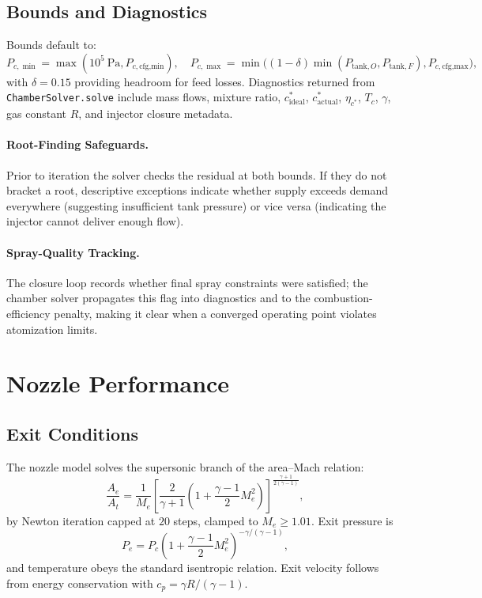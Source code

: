\documentclass[12pt]{article}
\begin{document}
\subsection{Bounds and Diagnostics}
Bounds default to:
\[
P_{c,\min} = \max(10^5~\text{Pa}, P_{c,\text{cfg,min}}),\quad
P_{c,\max} = \min\bigl((1-\delta)\min(P_{\text{tank},O}, P_{\text{tank},F}), P_{c,\text{cfg,max}}\bigr),
\]
with $\delta = 0.15$ providing headroom for feed losses.  Diagnostics returned from \verb|ChamberSolver.solve| include mass flows, mixture ratio, $c^*_{\text{ideal}}$, $c^*_{\text{actual}}$, $\eta_{c^*}$, $T_c$, $\gamma$, gas constant $R$, and injector closure metadata.

\paragraph{Root-Finding Safeguards.}  Prior to iteration the solver checks the residual at both bounds.  If they do not bracket a root, descriptive exceptions indicate whether supply exceeds demand everywhere (suggesting insufficient tank pressure) or vice versa (indicating the injector cannot deliver enough flow).

\paragraph{Spray-Quality Tracking.}  The closure loop records whether final spray constraints were satisfied; the chamber solver propagates this flag into diagnostics and to the combustion-efficiency penalty, making it clear when a converged operating point violates atomization limits.

\section{Nozzle Performance}

\subsection{Exit Conditions}
The nozzle model solves the supersonic branch of the area--Mach relation:
\[
\frac{A_e}{A_t} = \frac{1}{M_e}
\left[\frac{2}{\gamma+1}\left(1 + \frac{\gamma-1}{2}M_e^2\right)\right]^{\frac{\gamma+1}{2(\gamma-1)}},
\]
by Newton iteration capped at $20$ steps, clamped to $M_e \geq 1.01$.  Exit pressure is
\[
P_e = P_c \left(1 + \frac{\gamma-1}{2}M_e^2\right)^{-\gamma/(\gamma-1)},
\]
and temperature obeys the standard isentropic relation.  Exit velocity follows from energy conservation with $c_p = \gamma R / (\gamma-1)$.
\end{document}
